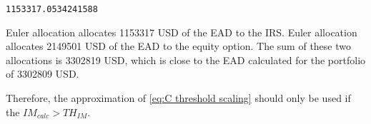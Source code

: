 \documentclass[11pt]{article}
\begin{document}
    \begin{Verbatim}[commandchars=\\\{\}]
1153317.0534241588
    \end{Verbatim}

    Euler allocation allocates 1153317 USD of the EAD to the IRS. Euler
allocation allocates 2149501 USD of the EAD to the equity option. The
sum of these two allocations is 3302819 USD, which is close to the EAD
calculated for the portfolio of 3302809 USD.

    
    Therefore, the approximation of \ref{eq:C threshold scaling} should only
be used if the \(IM_{calc} > TH_{IM}\).


    
    
    
\end{document}
